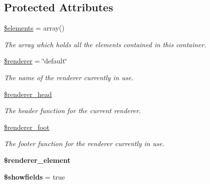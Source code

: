 \subsection*{Protected Attributes}
\begin{DoxyCompactItemize}
\item 
\hypertarget{class_container_a55cd96823d14f82b2865f0978ad7ce9c}{
\hyperlink{class_container_a55cd96823d14f82b2865f0978ad7ce9c}{\$elements} = array()}
\label{class_container_a55cd96823d14f82b2865f0978ad7ce9c}

\begin{DoxyCompactList}\small\item\em The array which holds all the elements contained in this container. \item\end{DoxyCompactList}\item 
\hypertarget{class_container_a9ec3c37905522af20d6a9fddadd1d0ca}{
\hyperlink{class_container_a9ec3c37905522af20d6a9fddadd1d0ca}{\$renderer} = \char`\"{}default\char`\"{}}
\label{class_container_a9ec3c37905522af20d6a9fddadd1d0ca}

\begin{DoxyCompactList}\small\item\em The name of the renderer currently in use. \item\end{DoxyCompactList}\item 
\hyperlink{class_container_a8d9081d6c3f2cfbadffda41b60647111}{\$renderer\_\-head}
\begin{DoxyCompactList}\small\item\em The header function for the current renderer. \item\end{DoxyCompactList}\item 
\hyperlink{class_container_a44d1d90a83f29db520115fb9d99167e5}{\$renderer\_\-foot}
\begin{DoxyCompactList}\small\item\em The footer function for the renderer currently in use. \item\end{DoxyCompactList}\item 
\hypertarget{class_container_ab794137e8dd585577d47a26746ef8d19}{
{\bfseries \$renderer\_\-element}}
\label{class_container_ab794137e8dd585577d47a26746ef8d19}

\item 
\hypertarget{class_container_ac890b0afc7f45abb6033d9588f066640}{
{\bfseries \$showfields} = true}
\label{class_container_ac890b0afc7f45abb6033d9588f066640}


\end{DoxyCompactItemize}
